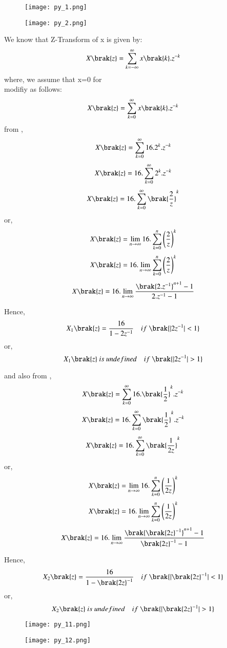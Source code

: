 \documentclass[beamer]{IEEEtran}
\theoremstyle{remark}
\begin{document}
\begin{figure}[h]
    \centering
    \texttt{[image: py\_1.png]}
    \label{fig:enter-label}
\end{figure}

\begin{figure}[h]
    \centering
    \texttt{[image: py\_2.png]}
    \label{fig:enter-label}
\end{figure}

We know that Z-Transform of x is given by:
\begin{align}
\label{a13}
    X\brak{z}=\sum_{k=-\infty}^{\infty} x\brak{k}.z^{-k}
\end{align}
where, we assume that x=0   for \\
\brak{\ref{a13}} modifiy as follows:
\begin{align}
\label{a14}
    X\brak{z}=\sum_{k=0}^{\infty} x\brak{k}.z^{-k}
\end{align}
from \brak{\ref{a11}},
$$X\brak{z}=\sum_{k=0}^{\infty} 16.2^k.z^{-k}$$
$$X\brak{z}=16.\sum_{k=0}^{\infty} 2^k.z^{-k}$$
$$X\brak{z}=16.\sum_{k=0}^{\infty} \brak{\frac{2}{z}}^k$$
or,
$$X\brak{z}=\lim_{n\to\infty}16.\sum_{k=0}^{n} \left(\frac{2}{z}\right)^k$$
$$X\brak{z}=16.\lim_{n\to\infty}\sum_{k=0}^{n}
\left(\frac{2}{z}\right)^k$$
$$X\brak{z}=16.\lim_{n\to\infty} \frac{\brak{2.z^{-1}}^{n+1}-1}{2.z^{-1}-1}$$

Hence,
$$X_1\brak{z}=\frac{16}{1-2z^{-1}}\quad if\ \brak{|2z^{-1}|<1}$$
or,
$$X_1\brak{z}\ is\ undefined\quad if\ \brak{|2z^{-1}|>1}$$

and also from \brak{\ref{a12}},
$$X\brak{z}=\sum_{k=0}^{\infty} 16.\brak{\frac{1}{2}}^k.z^{-k}$$
$$X\brak{z}=16.\sum_{k=0}^{\infty} \brak{\frac{1}{2}}^k.z^{-k}$$
$$X\brak{z}=16.\sum_{k=0}^{\infty} \brak{\frac{1}{2z}}^k$$
or,
$$X\brak{z}=\lim_{n\to\infty}16.\sum_{k=0}^{n} \left(\frac{1}{2z}\right)^k$$
$$X\brak{z}=16.\lim_{n\to\infty}\sum_{k=0}^{n}
\left(\frac{1}{2z}\right)^k$$
$$X\brak{z}=16.\lim_{n\to\infty} \frac{\brak{\brak{2z}^{-1}}^{n+1}-1}{{\brak{2z}^{-1}}-1}$$

Hence,
$$X_2\brak{z}=\frac{16}{1-{\brak{2z}^{-1}}}\quad if\ \brak{|{\brak{2z}^{-1}}|<1}$$
or,
$$X_2\brak{z}\ is\ undefined\quad if\ \brak{|{\brak{2z}^{-1}}|>1}$$
\begin{figure}[h]
    \centering
    \texttt{[image: py\_11.png]}
    \label{fig:enter-label}
\end{figure}
\begin{figure}[h]
    \centering
    \texttt{[image: py\_12.png]}
    \label{fig:enter-label}
\end{figure}
\end{document}
